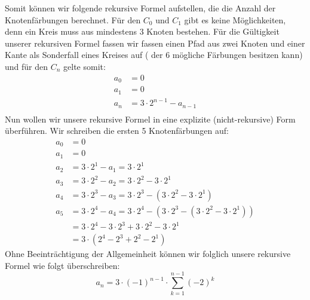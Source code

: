      Somit können wir folgende rekursive Formel aufstellen, die die Anzahl der Knotenfärbungen 
     berechnet. Für den $C_0$  und $C_1$ gibt es keine Möglichkeiten, denn ein Kreis muss aus mindestens 
     3 Knoten bestehen. Für die Gültigkeit unserer rekursiven Formel fassen wir fassen einen Pfad aus 
     zwei Knoten und einer Kante als Sonderfall eines Kreises auf ( der 6 mögliche Färbungen besitzen 
     kann) und für den $C_n$ gelte somit: 
     \begin{align*} 
     a_0 &= 0 \\ 
     a_1 &= 0  \\
     a_n &= 3\cdot 2^{n-1} - a_{n-1}\\ 
     \end{align*}
     Nun wollen wir unsere rekursive Formel in eine explizite (nicht-rekursive) Form überführen. Wir 
     schreiben die ersten 5 Knotenfärbungen auf:
     \begin{align*}
          a_0 &= 0\\
          a_1 &= 0\\
          a_2 &= 3\cdot 2^1 - a_1 = 3\cdot 2^1\\
          a_3 &= 3\cdot 2^2 - a_2 = 3\cdot 2^2 - 3\cdot 2^1\\
          a_4 &= 3\cdot 2^3 - a_3 = 3\cdot 2^3 - (3\cdot 2^2 - 3\cdot 2^1)\\
          a_5 &= 3\cdot 2^4 - a_4 = 3\cdot 2^4 - (3\cdot 2^3 - (3\cdot 2^2 - 3\cdot 2^1))\\
          &= 3\cdot 2^4 - 3\cdot 2^3 + 3\cdot 2^2 - 3\cdot 2^1\\
          &= 3\cdot (2^4 - 2^3 + 2^2 - 2^1)
        \end{align*} 
     Ohne Beeinträchtigung der Allgemeinheit können wir folglich unsere rekursive Formel wie folgt überschreiben:
     $$ a_n = 3 \cdot (-1)^{n-1} \cdot \sum_{k=1}^{n-1}(-2)^k$$
